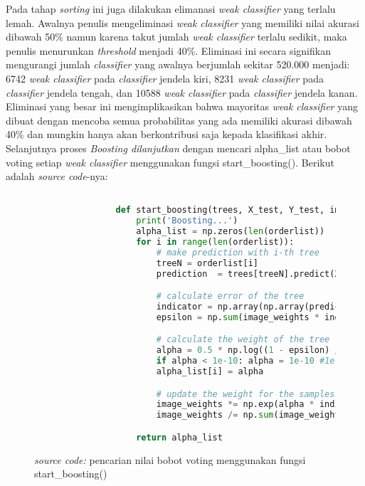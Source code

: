 		Pada tahap \textit{sorting} ini juga dilakukan elimanasi \emph{weak classifier} yang terlalu lemah. 
		Awalnya penulis mengeliminasi \emph{weak classifier} yang memiliki nilai akurasi dibawah 50\% 
		namun karena takut jumlah \emph{weak classifier} terlalu sedikit, maka penulis menurunkan \textit{threshold} 
		menjadi 40\%. Eliminasi ini secara signifikan mengurangi jumlah \emph{classifier} yang awalnya berjumlah 
		sekitar 520.000 menjadi: 6742 \emph{weak classifier} pada \emph{classifier} jendela kiri, 
		8231 \emph{weak classifier} pada \emph{classifier} jendela tengah, dan 
		10588 \emph{weak classifier} pada \emph{classifier} jendela kanan. Eliminasi yang besar ini 
		mengimplikasikan bahwa mayoritas \emph{weak classifier} yang dibuat dengan mencoba 
		semua probabilitas yang ada memiliki akurasi dibawah 40\% dan mungkin hanya akan berkontribusi 
		saja kepada klasifikasi akhir. Selanjutnya proses \emph{Boosting dilanjutkan} dengan 
		mencari alpha\_list atau bobot voting setiap \emph{weak classifier} menggunakan fungsi 
		start\_boosting(). Berikut adalah \textit{source code}-nya:

		\begin{figure}[H]
			\begin{lstlisting}[language=Python, basicstyle=\tiny]

				def start_boosting(trees, X_test, Y_test, image_weights, orderlist):
					print('Boosting...')
					alpha_list = np.zeros(len(orderlist))
					for i in range(len(orderlist)):
						# make prediction with i-th tree
						treeN = orderlist[i]
						prediction  = trees[treeN].predict(X_test)

						# calculate error of the tree
						indicator = np.array(np.array(prediction).astype(int) != Y_test.flatten(), dtype = float)
						epsilon = np.sum(image_weights * indicator) / np.sum(image_weights)

						# calculate the weight of the tree
						alpha = 0.5 * np.log((1 - epsilon) / (epsilon + 1e-10)) + np.log(4 - 1) #1e-10 const added to prevent div by 0. 4 is number of class
						if alpha < 1e-10: alpha = 1e-10 #1e-10 const added to prevent alpha getting too small in np.exp(alpha * indicator) later
						alpha_list[i] = alpha

						# update the weight for the samples so the sum of image_weight will be close to 1 for the next iteration
						image_weights *= np.exp(alpha * indicator)
						image_weights /= np.sum(image_weights)

					return alpha_list

			\end{lstlisting}
			\caption{\emph{source code:} pencarian nilai bobot voting menggunakan fungsi 
			start\_boosting()}
			\label{code: start boosting}
		\end{figure}

